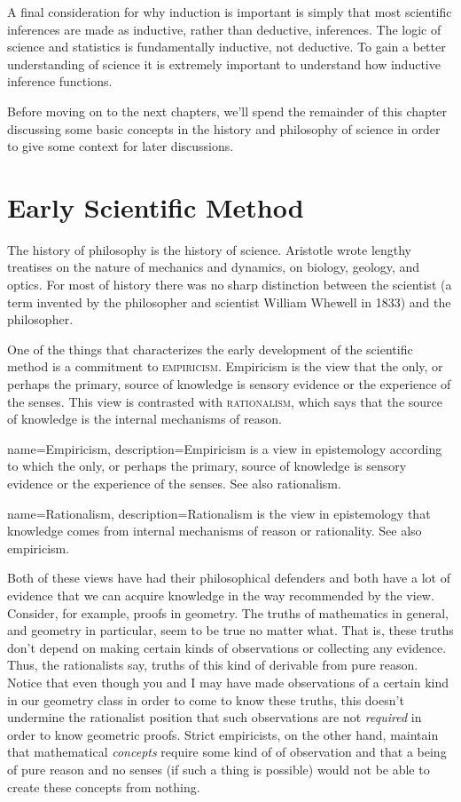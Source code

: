 A final consideration for why induction is important is simply that most scientific inferences are made as inductive, rather than deductive, inferences. The logic of science and statistics is fundamentally inductive, not deductive. To gain a better understanding of science it is extremely important to understand how inductive inference functions.

Before moving on to the next chapters, we'll spend the remainder of this chapter discussing some basic concepts in the history and philosophy of science in order to give some context for later discussions.

\section{Early Scientific Method}

The history of philosophy is the history of science. Aristotle wrote lengthy treatises on the nature of mechanics and dynamics, on biology, geology, and optics. For most of history there was no sharp distinction between the scientist (a term invented by the philosopher and scientist William Whewell in 1833) and the philosopher.

One of the things that characterizes the early development of the scientific method is a commitment to \textsc{\gls{empiricism}}. Empiricism is the view that the only, or perhaps the primary, source of knowledge is sensory evidence or the experience of the senses. This view is contrasted with \textsc{\gls{rationalism}}, which says that the source of knowledge is the internal mechanisms of reason.

{
name=Empiricism,
description={Empiricism is a view in epistemology according to which the only, or perhaps the primary, source of knowledge is sensory evidence or the experience of the senses. See also \gls{rationalism}.}
}

{
name=Rationalism,
description={Rationalism is the view in epistemology that knowledge comes from internal mechanisms of reason or rationality. See also \gls{empiricism}.}
}

Both of these views have had their philosophical defenders and both have a lot of evidence that we can acquire knowledge in the way recommended by the view. Consider, for example, proofs in geometry. The truths of mathematics in general, and geometry in particular, seem to be true no matter what. That is, these truths don't depend on making certain kinds of observations or collecting any evidence. Thus, the rationalists say, truths of this kind of derivable from pure reason. Notice that even though you and I may have made observations of a certain kind in our geometry class in order to come to know these truths, this doesn't undermine the rationalist position that such observations are not \emph{required} in order to know geometric proofs. Strict empiricists, on the other hand, maintain that mathematical \emph{concepts} require some kind of of observation and that a being of pure reason and no senses (if such a thing is possible) would not be able to create these concepts from nothing. 


